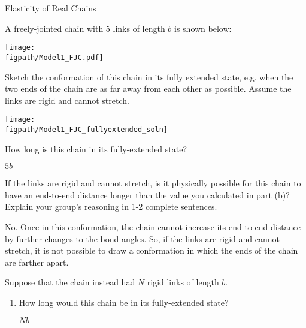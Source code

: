 \begin{activity}[extension]{Elasticity of Real Chains}
\begin{model}
	A freely-jointed chain with 5 links of length $b$ is shown below:
	
	\vspace{6pt}
	\centerline{\texttt{[image: \\figpath/Model1\_FJC.pdf]}}

\end{model}

\begin{ctqs}

	\question Sketch the conformation of this chain in its fully extended state, e.g. when the two ends of the chain are as far away from each other as possible.  Assume the links are rigid and cannot stretch.
			
				\begin{solution}[0.25in]{}
					\centerline{\texttt{[image: \\figpath/Model1\_FJC\_fullyextended\_soln]}}
				\end{solution}
			
	\question How long is this chain in its fully-extended state?
			
				\begin{solution}[0.25in]{}
					$5b$
				\end{solution}
			
	\question If the links are rigid and cannot stretch, is it physically possible for this chain to have an end-to-end distance longer than the value you calculated in part (b)?  Explain your group's reasoning in 1-2 complete sentences. \label{\labelbase:ctq:5b-reasoning}
			
				\begin{solution}[1.25in]{}
					No.  Once in this conformation, the chain cannot increase its end-to-end distance by further changes to the bond angles.  So, if the links are rigid and cannot stretch, it is not possible to draw a conformation in which the ends of the chain are farther apart.
				\end{solution}
		
	\question Suppose that the chain instead had $N$ rigid links of length $b$.
	
		\begin{enumerate}
		
			\item How long would this chain be in its fully-extended state?
			
				\begin{solution}[0.5in]{}
					$Nb$
				\end{solution}
			

\end{enumerate}
\end{ctqs}
\end{activity}
